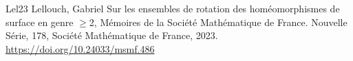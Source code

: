\begin{thebibliography}{Lel23}
 Lellouch, Gabriel Sur les ensembles de rotation des homéomorphismes de surface en genre $\geq$2, Mémoires de la Société Mathématique de France. Nouvelle Série, 178, Société Mathématique de France, 2023. \url{https://doi.org/10.24033/msmf.486}
\end{thebibliography}
